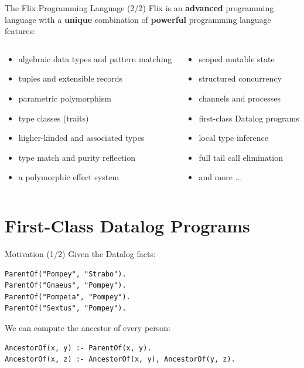 \begin{frame}{The Flix Programming Language (2/2)}
Flix is an \textbf{advanced} programming language with a \textbf{unique}
combination of \textbf{powerful} programming language features: 

\small
\begin{columns}
\begin{column}{.55\textwidth}
\begin{itemize}
    \item algebraic data types and pattern matching 
    \item tuples and extensible records 
    \item parametric polymorphism
    \item type classes (traits)
    \item higher-kinded and associated types
    \item type match and purity reflection
    \item a polymorphic effect system 
\end{itemize}
\end{column}
\begin{column}{.45\textwidth}
\begin{itemize}
    \item scoped mutable state
    \item structured concurrency
    \item channels and processes
    \item first-class Datalog programs
    \item local type inference
    \item full tail call elimination
    \item and more ...
\end{itemize}
\end{column}
\end{columns}
\end{frame}

\section{First-Class Datalog Programs}

\begin{frame}[fragile]{Motivation (1/2)}
Given the Datalog facts:

\begin{lstlisting}[language=flix, xleftmargin=0.8cm]
ParentOf("Pompey", "Strabo").
ParentOf("Gnaeus", "Pompey").
ParentOf("Pompeia", "Pompey").
ParentOf("Sextus", "Pompey").
\end{lstlisting}

\pause

We can compute the ancestor of every person:

\begin{lstlisting}[language=flix, xleftmargin=0.8cm]
AncestorOf(x, y) :- ParentOf(x, y).
AncestorOf(x, z) :- AncestorOf(x, y), AncestorOf(y, z).
\end{lstlisting}
\end{frame}

